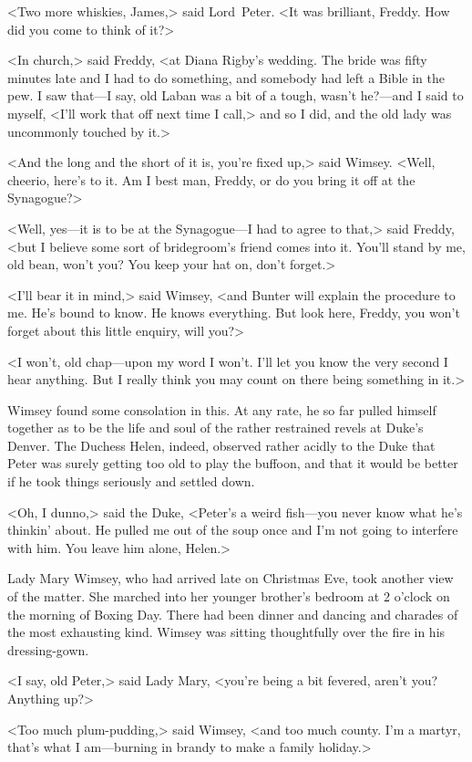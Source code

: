 <Two more whiskies, James,> said Lord~Peter. <It was brilliant, Freddy. How did you come to think of it?>

<In church,> said Freddy, <at Diana Rigby's wedding. The bride was fifty minutes late and I had to do something, and somebody had left a Bible in the pew. I saw that—I say, old Laban was a bit of a tough, wasn't he?—and I said to myself, <I'll work that off next time I call,> and so I did, and the old lady was uncommonly touched by it.>

<And the long and the short of it is, you're fixed up,> said Wimsey. <Well, cheerio, here's to it. Am I best man, Freddy, or do you bring it off at the Synagogue?>

<Well, yes—it is to be at the Synagogue—I had to agree to that,> said Freddy, <but I believe some sort of bridegroom's friend comes into it. You'll stand by me, old bean, won't you? You keep your hat on, don't forget.>

<I'll bear it in mind,> said Wimsey, <and Bunter will explain the procedure to me. He's bound to know. He knows everything. But look here, Freddy, you won't forget about this little enquiry, will you?>

<I won't, old chap—upon my word I won't. I'll let you know the very second I hear anything. But I really think you may count on there being something in it.>

Wimsey found some consolation in this. At any rate, he so far pulled himself together as to be the life and soul of the rather restrained revels at Duke's Denver. The Duchess Helen, indeed, observed rather acidly to the Duke that Peter was surely getting too old to play the buffoon, and that it would be better if he took things seriously and settled down.

<Oh, I dunno,> said the Duke, <Peter's a weird fish—you never know what he's thinkin' about. He pulled me out of the soup once and I'm not going to interfere with him. You leave him alone, Helen.>

Lady Mary Wimsey, who had arrived late on Christmas Eve, took another view of the matter. She marched into her younger brother's bedroom at 2 o'clock on the morning of Boxing Day. There had been dinner and dancing and charades of the most exhausting kind. Wimsey was sitting thoughtfully over the fire in his dressing-gown.

<I say, old Peter,> said Lady Mary, <you're being a bit fevered, aren't you? Anything up?>

<Too much plum-pudding,> said Wimsey, <and too much county. I'm a martyr, that's what I am—burning in brandy to make a family holiday.>

